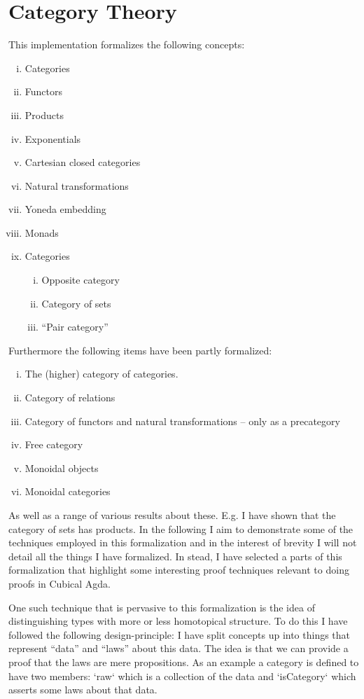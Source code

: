 \chapter{Category Theory}
\label{ch:implementation}
This implementation formalizes the following concepts:
%
\begin{enumerate}[i.]
\item Categories
\item Functors
\item Products
\item Exponentials
\item Cartesian closed categories
\item Natural transformations
\item Yoneda embedding
\item Monads
\item Categories
  \begin{enumerate}[i.]
  \item Opposite category
  \item Category of sets
  \item ``Pair category''
  \end{enumerate}
\end{enumerate}
%
Furthermore the following items have been partly formalized:
%
\begin{enumerate}[i.]
\item The (higher) category of categories.
\item Category of relations
\item Category of functors and natural transformations -- only as a precategory
\item Free category
\item Monoidal objects
\item Monoidal categories
\end{enumerate}
%
As well as a range of various results about these. E.g. I have shown that the
category of sets has products. In the following I aim to demonstrate some of the
techniques employed in this formalization and in the interest of brevity I will
not detail all the things I have formalized. In stead, I have selected a parts
of this formalization that highlight some interesting proof techniques relevant
to doing proofs in Cubical Agda.

One such technique that is pervasive to this formalization is the idea of
distinguishing types with more or less homotopical structure. To do this I have
followed the following design-principle: I have split concepts up into things
that represent ``data'' and ``laws'' about this data. The idea is that we can
provide a proof that the laws are mere propositions. As an example a category is
defined to have two members: `raw` which is a collection of the data and
`isCategory` which asserts some laws about that data.

